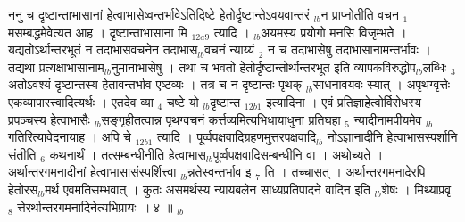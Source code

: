 \documentclass[article,12pt,a4paper]{memoir}%
\newcounter{parCount}
\begin{document}
	  
	  \pstart \leavevmode%
	ननु च दृष्टान्ताभासानां हेत्वाभासेष्वन्तर्भावेऽतिदिष्टे हेतोर्दृष्टान्तेऽवयवान्तरं {\tiny $_{lb}$}न प्राप्नोतीति वचन {\tiny $_{1}$} मसम्बद्धमेवेत्यत आह । {\color{DodgerBlue3}दृष्टान्ताभासाना} मि {\tiny $_{12a9}$} त्यादि । {\tiny $_{lb}$}अयमस्य प्रयोगो मनसि विजृम्भते । यद्यतोऽर्थान्तरभूतं न तदाभासवचनेन तदाभास{\tiny $_{lb}$}वचनं न्याय्यं {\tiny $_{2}$} न च तदाभासेषु तदाभासानामन्तर्भावः । तद्यथा प्रत्यक्षाभासानाम{\tiny $_{lb}$}नुमानाभासेषु । तथा च भवतो हेतोर्दृष्टान्तोर्थान्तरभूत इति व्यापकविरुद्धोप{\tiny $_{lb}$}लब्धिः {\tiny $_{3}$} अतोऽवश्यं दृष्टान्तस्य हेतावन्तर्भाव एष्टव्यः । तत्र च न दृष्टान्तः पृथक् {\tiny $_{lb}$}साधनावयवः स्यात् । अपृथग्वृत्तेः एकव्यापारत्त्वादित्यर्थः । एतदेव व्या {\tiny $_{4}$} चष्टे {\color{DodgerBlue3}यो {\tiny $_{lb}$}दृष्टान्त} {\tiny $_{12b1}$} इत्यादिना । एवं प्रतिज्ञाहेत्वोर्विरोधस्य प्रपञ्चस्य हेत्वाभासैः {\tiny $_{lb}$}सङ्गृहीतत्वान्न पृथग्वचनं कर्त्तव्यमित्यभिधायाधुना प्रतिघहा {\tiny $_{5}$} न्यादीनामपीयमेव {\tiny $_{lb}$}गतिरित्यावेदनायाह । {\color{DodgerBlue3}अपि चे} {\tiny $_{12b1}$} त्यादि । पूर्व्वपक्षवादिग्रहणमुत्तरपक्षवादि{\tiny $_{lb}$}\leavevmode{} नोऽज्ञानादीनि हेत्वाभासस्पर्शानि संतीति {\tiny $_{6}$} कथनार्थं । तत्सम्बन्धीनीति हेत्वाभास{\tiny $_{lb}$}पूर्व्वपक्षवादिसम्बन्धीनि वा । अथोच्यते । अर्थान्तरगमनादीनां हेत्वाभासासंस्पर्शित्त्वा {\tiny $_{lb}$}न्नतेस्वन्तर्भाव इ {\tiny $_{7}$} ति । तच्चासत् । अर्थान्तरगमनादेरपि हेतोरस{\tiny $_{lb}$}मर्थ एवमतिसम्भवात् । कुतः असमर्थस्य न्यायबलेन साध्यप्रतिपादने वादिन इति {\tiny $_{lb}$}शेषः । मिथ्याप्रवृ {\tiny $_{8}$} त्तेरर्थान्तरगमनादिनेत्यभिप्रायः ॥ ४ ॥
	{}
	\pend%
      {\tiny $_{lb}$}
\end{document}
